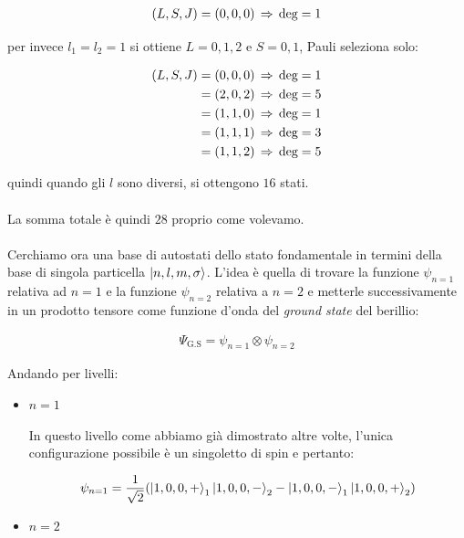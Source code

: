 \begin{itemize}
	\begin{align*}
		\qty(L, S, J) = \qty(0, 0, 0) \, \Rightarrow \, \text{deg} = 1
	\end{align*}

		per invece $l_1 = l_2 = 1$ si ottiene $L = 0, 1, 2$ e $S = 0, 1$, Pauli seleziona solo:
	
	\begin{align*}
		\qty(L, S, J) & = \qty(0, 0, 0) \, \Rightarrow \, \text{deg} = 1 \\ 
		& = \qty(2, 0, 2) \, \Rightarrow \, \text{deg} = 5 \\ 
		& = \qty(1, 1, 0) \, \Rightarrow \, \text{deg} = 1 \\
		& = \qty(1, 1, 1) \, \Rightarrow \, \text{deg} = 3 \\
		& = \qty(1, 1, 2) \, \Rightarrow \, \text{deg} = 5 \\
	\end{align*}
		
		quindi quando gli $l$ sono diversi, si ottengono $16$ stati. 
		\\
		\\
		La somma totale è quindi $28$ proprio come volevamo.
		\\
		\\
		Cerchiamo ora una base di autostati dello stato fondamentale in termini della base di singola particella $\ket{n, l, m, \sigma}$. L'idea è quella di trovare la funzione $\psi_{n = 1}$ relativa ad $n = 1$ e la funzione $\psi_{n = 2}$ relativa a $n = 2$ e metterle successivamente in un prodotto tensore come funzione d'onda del \textit{ground state} del berillio:
		
	\begin{align*}
		\Psi_{\text{G.S}} = \psi_{n = 1} \otimes \psi_{n = 2}
	\end{align*}
	
		Andando per livelli:
		
	\begin{itemize}
		\item $n = 1$
		
			In questo livello come abbiamo già dimostrato altre volte, l'unica configurazione possibile è un singoletto di spin e pertanto:
			
		\begin{align*}
			\psi_{n = 1} = \frac{1}{\sqrt{2}} \qty( \ket{1, 0, 0, +}_1 \ket{1, 0, 0, -}_2 - \ket{1, 0, 0, -}_1 \ket{1, 0, 0, +}_2)
		\end{align*}

		\item $n = 2$
		

\end{itemize}
\end{itemize}
